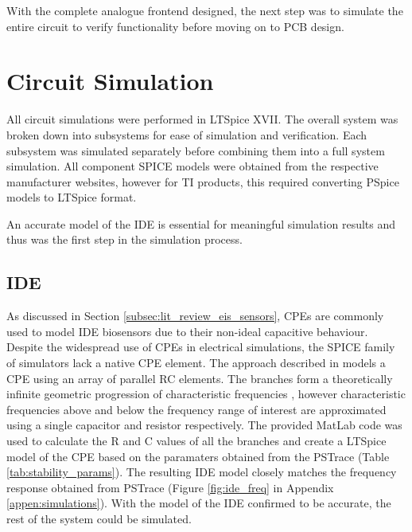 With the complete analogue frontend designed, the next step was to simulate the entire circuit to verify functionality before moving on to PCB design.

\section{Circuit Simulation}
All circuit simulations were performed in LTSpice XVII. The overall system was broken down into subsystems for ease of simulation and verification. Each subsystem was simulated separately before combining them into a full system simulation. All component SPICE models were obtained from the respective manufacturer websites, however for TI products, this required converting PSpice models to LTSpice format.

An accurate model of the \ac{IDE} is essential for meaningful simulation results and thus was the first step in the simulation process.
\subsection{IDE}
As discussed in Section \ref{subsec:lit_review_eis_sensors}, \acp{CPE} are commonly used to model \ac{IDE} biosensors due to their non-ideal capacitive behaviour. Despite the widespread use of \acp{CPE} in electrical simulations, the SPICE family of simulators lack a native CPE element. The approach described in \cite{wilsonSimulatingFractionalCapacitors2023} models a CPE using an array of parallel RC elements. The branches form a theoretically infinite geometric progression of characteristic frequencies \cite{wilsonSimulatingFractionalCapacitors2023}, however characteristic frequencies above and below the frequency range of interest are approximated using a single capacitor and resistor respectively. The provided MatLab code was used to calculate the R and C values of all the branches and create a LTSpice model of the CPE based on the paramaters obtained from the PSTrace (Table \ref{tab:stability_params}). The resulting IDE model closely matches the frequency response obtained from PSTrace (Figure \ref{fig:ide_freq} in Appendix \ref{appen:simulations}). With the model of the \ac{IDE} confirmed to be accurate, the rest of the system could be simulated.

